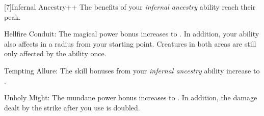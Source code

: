     [7]{Infernal Ancestry++} The benefits of your \textit{infernal ancestry} ability reach their peak.
      \begin{raggeditemize}
        \item Hellfire Conduit: The magical power bonus increases to .
          In addition, your  ability also affects  in a \smallarea radius from your starting point.
          Creatures in both areas are still only affected by the ability once.
        \item Tempting Allure: The skill bonuses from your \textit{infernal ancestry} ability increase to .
        \item Unholy Might: The mundane power bonus increases to .
          In addition, the damage dealt by the strike after you use  is doubled.
      \end{raggeditemize}






